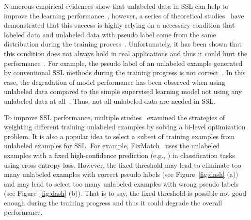 \documentclass{article}
\begin{document}
\begin{figure*}[t]
    \centering
    \caption{An example of experimental results on Wide ResNet-28-8 for CIFAR-100 with 400 labeled images illustrates the reason of dynamically selecting unlabeled data to train learning models. Pseudo labels are generated based on the prediction models. FixMatch selects unlabeled example if its confidence prediction is greater than , while the proposed Dash algorithm selects unlabeled example based on a dynamic threshold through optimization iterations. (a) The proposed Dash selects more examples with correct pseudo labels than that of FixMatch. (b) The proposed Dash maintains much more examples with wrong pseudo labels at the beginning but it will drop off more examples with wrong pseudo labels after several epochs, comparing to FixMatch.}\label{fig:dash}
\end{figure*}
Numerous empirical evidences show that unlabeled data in SSL can help to improve the learning performance~\citep{berthelot2019mixmatch,berthelot2019remixmatch,sohn2020fixmatch}, however, a series of theoretical studies~\citep{ben2008does,singh2009unlabeled,li2011towards, balcan2005pac} have demonstrated that this success is highly relying on a necessary condition that labeled data and unlabeled data with pseudo label come from the same distribution during the training process~\citep{zhu2005semi,van2020survey}.
Unfortunately, it has been shown that this condition does not always hold in real applications and thus it could hurt the performance~\citep{li2017learning,oliver2018realistic}. For example, the pseudo label of an unlabeled example generated by conventional SSL methods during the training progress is not correct~\citep{hataya2019unifying, li2020dividemix}. In this case, the degradation of model performance has been observed when using unlabeled data compared to the simple supervised learning model not using any unlabeled data at all~\citep{chapelle2006semi,oliver2018realistic}. Thus, {not all unlabeled data are needed in SSL}.


To improve SSL performance, multiple studies~\citep{guosafe2020,ren2020not} examined the strategies of weighting different training unlabeled examples by solving a bi-level optimization problem. It is also a popular idea to select a subset of training examples from unlabeled examples for SSL. For example, FixMatch~\citep{sohn2020fixmatch} uses the unlabeled examples with a fixed high-confidence prediction (e.g., ) in classification tasks using cross entropy loss. However, the fixed threshold may lead to eliminate too many unlabeled examples with correct pseudo labels (see Figure~\ref{fig:dash} (a)) and may lead to select too many unlabeled examples with wrong pseudo labels (see Figure~\ref{fig:dash} (b)). That is to say, the fixed  threshold is possible not good enough during the training progress and thus it could degrade the overall performance.
\end{document}
